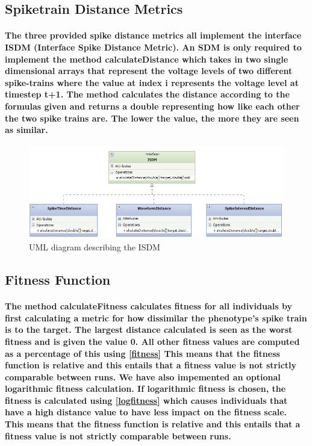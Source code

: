 \documentclass[titlepage,norsk]{article}
\begin{document}
\subsection{Spiketrain Distance Metrics}

\paragraph{
The three provided spike distance metrics all implement the interface ISDM (Interface Spike Distance Metric). An SDM is only required to implement the method calculateDistance which takes in two single dimensional arrays that represent the voltage levels of  two different spike-trains where the value at index i represents the voltage level at timestep t+1. The method calculates the distance according to the formulas given and returns a double representing how like each other the two spike trains are. The lower the value, the more they are seen as similar. 
}

\begin{figure}
\centering
\includegraphics[scale=0.75]{ISDM.png}
\caption{UML diagram describing the ISDM}
\label{fig:awesome_image}
\end{figure}

\subsection{Fitness Function}

\paragraph{
The method calculateFitness calculates fitness for all individuals by first calculating a metric for how dissimilar the phenotype’s spike train is to the target. The largest distance calculated is seen as the worst fitness and is given the value 0. All other fitness values are computed as a percentage of this using \eqref{fitness} This means that the fitness function is relative and this entails that a fitness value is not strictly comparable between runs. We have also impemented an optional logarithmic fitness calculation. If logarithmic fitness is chosen, the fitness is calculated using \eqref{logfitness} which causes individuals that have a high distance value to have less impact on the fitness scale.
This means that the fitness function is relative and this entails that a fitness value is not strictly comparable between runs.
}
\end{document}
